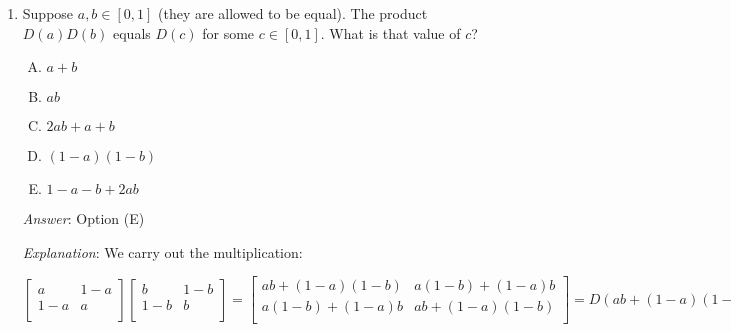 \documentclass[10pt]{amsart}
\begin{document}
\begin{enumerate}
  {\em Answer}: Option (C)

  {\em Explanation}: This follows by combining the two preceding questions.

  {\em Performance review}: 18 out of 22 got this. 3 chose (E), 1 chose (A).
 
  {\em Historical note (last time)}: $11$ out of $24$ got this. $8$ chose (D),
  $4$ chose (E), $1$ chose (A).

  \vspace{0.6in}

  We now consider the case $n = 2$. In this case, the doubly
  stochastic matrices have the form:

  $$\left[ \begin{matrix} a & 1 - a \\ 1 - a & a \\\end{matrix}\right]$$

  where $a \in [0,1]$. Denote this matrix by $D(a)$ for short.

\item Suppose $a,b \in [0,1]$ (they are allowed to be equal). The
  product $D(a)D(b)$ equals $D(c)$ for some $c \in [0,1]$. What is
  that value of $c$?

  \begin{enumerate}[(A)]
  \item $a + b$
  \item $ab$
  \item $2ab + a + b$
  \item $(1 - a)(1 - b)$
  \item $1 - a - b + 2ab$
  \end{enumerate}

  {\em Answer}: Option (E)

  {\em Explanation}: We carry out the multiplication:

  $$\left[\begin{matrix} a & 1 - a \\ 1 - a & a \\\end{matrix}\right]\left[\begin{matrix} b & 1 - b \\ 1 - b & b \\\end{matrix}\right] = \left[ \begin{matrix} ab + (1 - a)(1 - b) & a(1 - b) + (1 - a)b \\ a(1- b) + (1 - a)b & ab + (1 - a)(1 - b)\\\end{matrix}\right] = D(ab + (1 - a)(1 - b)) = D(1 - a - b + 2ab)$$


\end{enumerate}
\end{document}
